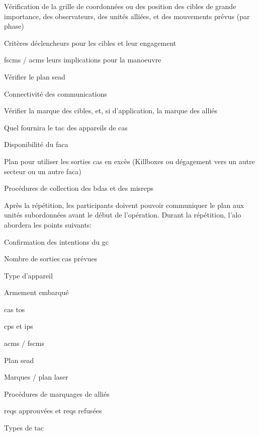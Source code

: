 \begin{e1}
\begin{e2}
		\begin{e3}
			\item Vérification de la grille de coordonnées ou des position des cibles de grande importance, des observateurs, des unités alliées, et des mouvements prévus (par phase)
			\item Critères déclencheurs pour les cibles et leur engagement
			\item \glspl{fscm} / \glspl{acm} leurs implications pour la manoeuvre
			\item Vérifier le plan \gls{sead}
			\item Connectivité des communications
			\item Vérifier la marque des cibles, et, si d'application, la marque des alliés
			\item Quel \ja{} fournira le \gls{tac} des appareils de \gls{cas}
			\begin{e4}
				\item Disponibilité du \gls{faca}
				\item Plan pour utiliser les sorties \gls{cas} en excès (Killboxes ou dégagement vers un autre secteur ou un autre \gls{faca})
				\item Procédures de collection des \glspl{bda} et des \glspl{misrep}
			\end{e4}
			\item Après la répétition, les participants doivent pouvoir communiquer le plan aux unités subordonnées avant le début de l'opération. Durant la répétition, l'\gls{alo} abordera les points suivants:
			\begin{e4}
				\item Confirmation des intentions du \gls{gc}
				\item Nombre de sorties \gls{cas} prévues
				\item Type d'appareil
				\item Armement embarqué
				\item \gls{cas} \gls{tos}
				\item \glspl{cp} et \glspl{ip}
				\item \glspl{acm} / \glspl{fscm}
				\item Plan \gls{sead}
				\item Marques / plan laser
				\item Procédures de marquages de alliés
				\item \glspl{req} approuvées et \glspl{req} refusées
				\item Types de \gls{tac}
			\end{e4}

\end{e3}
\end{e2}
\end{e1}
